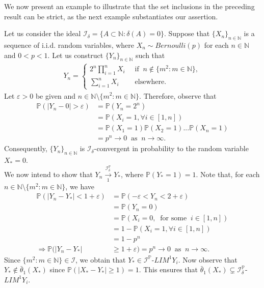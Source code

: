 \documentclass[reqno]{amsart}
\begin{document}
We now present an example to illustrate that the set inclusions in the preceding result can be strict, as the next example substantiates our assertion. 
\begin{example}
	Let us consider the ideal $\mathcal{I}_\delta=\{A\subset\mathbb{N}:\delta(A)=0\}$. Suppose that $\{X_n\}_{n\in\mathbb{N}}$ is a sequence of i.i.d. random variables, where $X_n\sim Bernoulli(p)$ for each $n\in\mathbb{N}$ and $0<p<1$. Let us construct $\{Y_n\}_{n\in\mathbb{N}}$ such that
\begin{align*}
	Y_n=
	\begin{cases}
		2^n\displaystyle\prod_{i=1}^{n} X_i~&\mbox{ if }~ n\notin\{m^2:m\in\mathbb{N}\},\\
		\displaystyle\sum_{i=1}^{n}X_i ~&\mbox{ elsewhere}.
	\end{cases}
\end{align*}
Let $\varepsilon>0$ be given and  $n\in\mathbb{N}\setminus\{m^2:m\in\mathbb{N}\}$. Therefore, observe that 
\begin{align*}
	\mathbb{P}(|Y_n-0|>\varepsilon)&=\mathbb{P}(Y_n=2^n)\\
                               	   &=\mathbb{P}(X_i=1,\forall i\in [1,n])\\
                               	   &=\mathbb{P}(X_1=1)\mathbb{P}(X_2=1)...\mathbb{P}(X_n=1)\\
                               	   &=p^n\to 0~\mbox{ as }~n\to\infty.
\end{align*}
Consequently, $\{Y_n\}_{n\in\mathbb{N}}$ is $\mathcal{I}_\delta$-convergent in probability to the random variable $X_*=0$.\\

We now intend to show that $Y_n\xrightarrow[1]{\mathcal{I}_{\delta}^{\mathbb{P}}} Y_*$, where $\mathbb{P}(Y_*=1)=1$. Note that, for each $n\in\mathbb{N}\setminus\{m^2:m\in\mathbb{N}\}$, we have
\begin{align*}
\mathbb{P}(|Y_n-Y_*|<1+\varepsilon)&=\mathbb{P}(-\varepsilon<Y_n<2+\varepsilon)\\
                                   &=\mathbb{P}(Y_n=0)\\
                                   &=\mathbb{P}(X_i=0,~\mbox{ for some }~i\in [1,n])\\
                                   &=1-\mathbb{P}(X_i=1,\forall i\in [1,n])\\
                                   &=1-p^n\\
                                   \Rightarrow \mathbb{P}(|Y_n-Y_*|&\geq 1+\varepsilon)=p^n\to 0~\mbox{ as }~n\to\infty.
\end{align*}
Since $\{m^2:m\in\mathbb{N}\}\in\mathcal{I}$, we obtain that $Y_*\in\mathcal{I}^{\mathbb{P}}$-$LIM^{1}Y_i$. Now observe that $Y_*\notin \bar{\theta}_1(X_*)$ since $\mathbb{P}(|X_*-Y_*|\geq 1)=1$. This ensures that $\bar{\theta}_1(X_*)\subsetneq \mathcal{I}_{\delta}^{\mathbb{P}}$-$LIM^{1}Y_i$.\\


\end{example}
\end{document}
